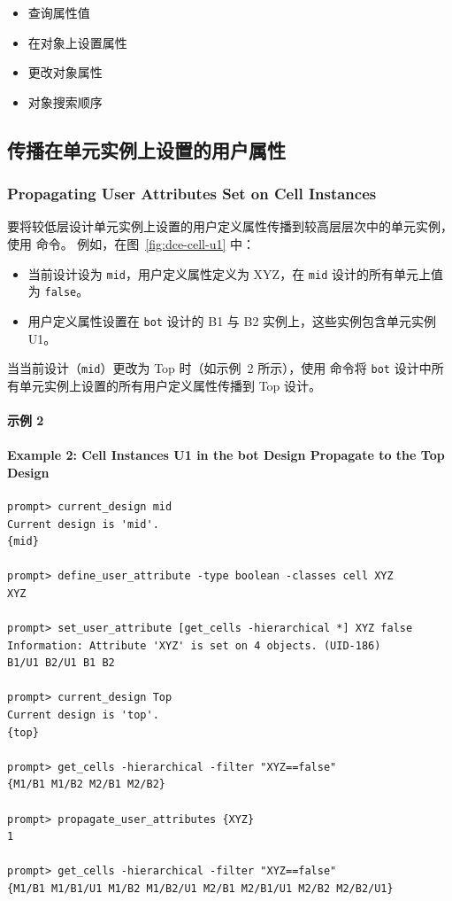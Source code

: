 \begin{seeAlsoBox}
\begin{itemize}
  \item 查询属性值
  \item 在对象上设置属性
  \item 更改对象属性
  \item 对象搜索顺序
\end{itemize}
\end{seeAlsoBox}

\subsection{传播在单元实例上设置的用户属性}
\subsubsection*{Propagating User Attributes Set on Cell Instances}

要将较低层设计单元实例上设置的用户定义属性传播到较高层层次中的单元实例，使用  命令。
例如，在图~\ref{fig:dce-cell-u1} 中：
\begin{itemize}
  \item 当前设计设为 \texttt{mid}，用户定义属性定义为 XYZ，在 \texttt{mid} 设计的所有单元上值为 \texttt{false}。
  \item 用户定义属性设置在 \texttt{bot} 设计的 B1 与 B2 实例上，这些实例包含单元实例 U1。
\end{itemize}


当当前设计（\texttt{mid}）更改为 Top 时（如示例~2 所示），使用  命令将 \texttt{bot} 设计中所有单元实例上设置的所有用户定义属性传播到 Top 设计。

\paragraph{示例 2}
\paragraph*{Example 2: Cell Instances U1 in the bot Design Propagate to the Top Design}
\begin{lstlisting}
prompt> current_design mid
Current design is 'mid'.
{mid}

prompt> define_user_attribute -type boolean -classes cell XYZ
XYZ

prompt> set_user_attribute [get_cells -hierarchical *] XYZ false
Information: Attribute 'XYZ' is set on 4 objects. (UID-186)
B1/U1 B2/U1 B1 B2

prompt> current_design Top
Current design is 'top'.
{top}

prompt> get_cells -hierarchical -filter "XYZ==false"
{M1/B1 M1/B2 M2/B1 M2/B2}

prompt> propagate_user_attributes {XYZ}
1

prompt> get_cells -hierarchical -filter "XYZ==false"
{M1/B1 M1/B1/U1 M1/B2 M1/B2/U1 M2/B1 M2/B1/U1 M2/B2 M2/B2/U1}
\end{lstlisting}

